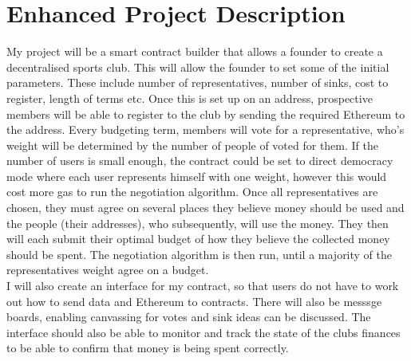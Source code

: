 \chapter{Enhanced Project Description} \label{Chapter: Enhanced Project Description}
My project will be a smart contract builder that allows a founder to create a decentralised sports club. This will allow the founder to set some of the initial parameters. These include number of representatives, number of sinks, cost to register, length of terms etc. Once this is set up on an address, prospective members will be able to register to the club by sending the required Ethereum to the address. Every budgeting term, members will vote for a representative, who’s weight will be determined by the number of people of voted for them. If the number of users is small enough, the contract could be set to direct democracy mode where each user represents himself with one weight, however this would cost more gas to run the negotiation algorithm. Once all representatives are chosen, they must agree on several places they believe money should be used and the people (their addresses), who subsequently, will use the money. They then will each submit their optimal budget of how they believe the collected money should be spent. The negotiation algorithm is then run, until a majority of the representatives weight agree on a budget. \\ I will also create an interface for my contract, so that users do not have to work out how to send data and Ethereum to contracts. There will also be messsge boards, enabling canvassing for votes and sink ideas can be discussed. The interface should also be able to monitor and track the state of the clubs finances to be able to confirm that money is being spent correctly. 
